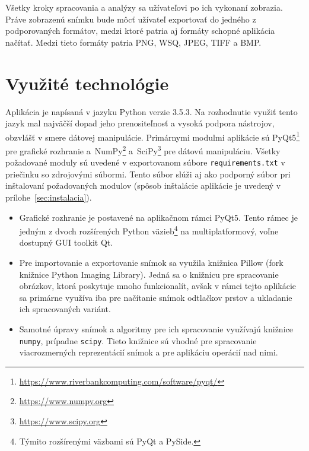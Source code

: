   Všetky kroky spracovania a analýzy sa užívateľovi po ich vykonaní zobrazia. Práve zobrazenú snímku bude môcť užívateľ exportovať do jedného z podporovaných
  formátov, medzi ktoré patria aj formáty schopné aplikácia načítať. Medzi tieto formáty patria PNG, WSQ, JPEG, TIFF a BMP.

  \section{Využité technológie}
  Aplikácia je napísaná v jazyku Python verzie 3.5.3. Na rozhodnutie využiť tento jazyk mal najväčší dopad jeho prenositeľnosť a vysoká podpora nástrojov,
  obzvlášť v smere dátovej manipulácie. Primárnymi modulmi aplikácie sú PyQt5\footnote{\url{https://www.riverbankcomputing.com/software/pyqt/}} pre grafické
  rozhranie a~NumPy\footnote{\url{https://www.numpy.org}} a~SciPy\footnote{\url{https://www.scipy.org}} pre dátovú manipuláciu.
  Všetky požadované moduly sú uvedené v exportovanom súbore \texttt{requirements.txt} v priečinku so zdrojovými súbormi. Tento súbor slúži aj ako
  podporný súbor pri inštalovaní požadovaných modulov (spôsob inštalácie aplikácie je uvedený v prílohe~{\ref{sec:instalacia}}).

  \begin{itemize}
    \item Grafické rozhranie je postavené na aplikačnom rámci PyQt5. Tento rámec je jedným z dvoch rozšírených Python väzieb\footnote{Týmito rozšírenými
          väzbami sú PyQt a PySide.}
          na multiplatformový, voľne dostupný GUI toolkit Qt.
    \item Pre importovanie a exportovanie snímok sa využila knižnica Pillow (fork knižnice Python Imaging Library). Jedná sa o knižnicu pre spracovanie obrázkov,
          ktorá poskytuje mnoho funkcionalít, avšak v rámci tejto aplikácie sa primárne využíva iba pre načítanie snímok odtlačkov prstov a ukladanie
          ich spracovaných variánt.
    \item Samotné úpravy snímok a algoritmy pre ich spracovanie využívajú knižnice \texttt{numpy}, prípadne \texttt{scipy}. Tieto knižnice sú vhodné pre
          spracovanie viacrozmerných reprezentácií snímok a pre aplikáciu operácií nad nimi.
  \end{itemize}

